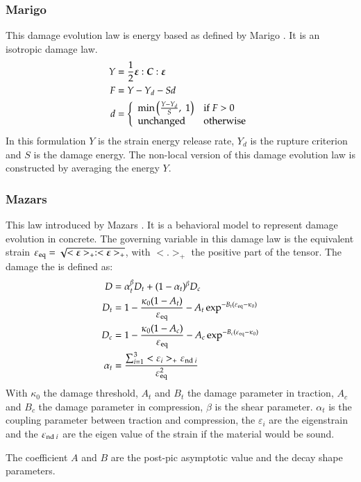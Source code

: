 \subsubsection{Marigo}
This damage evolution law is energy based as defined by Marigo \cite{marigo81a,
  lemaitre96a}. It is an isotropic damage law.
\begin{align}
  Y &= \frac{1}{2}\boldsymbol{\varepsilon}:\boldsymbol{C}:\boldsymbol{\varepsilon}\\
  F &= Y - Y_d - S d\\
  d &= \left\{
    \begin{array}{l l}
      \mathrm{min}\left(\frac{Y-Y_d}{S},\;1\right) & \mathrm{if}\; F > 0\\
      \mathrm{unchanged} & \mathrm{otherwise}
    \end{array}
  \right.
\end{align}
In this formulation $Y$ is the strain  energy release rate, $Y_d$ is the rupture
criterion and  $S$ is the damage  energy.  The non-local version  of this damage
evolution law is constructed by averaging the energy $Y$.

\subsubsection{Mazars}
This law introduced by Mazars \cite{mazars84a}. It is a behavioral model to
represent damage evolution in concrete. The governing variable in this damage
law is the equivalent strain $\varepsilon_{{\mathrm{eq}}} =
\sqrt{<\boldsymbol{\varepsilon}>_+:<\boldsymbol{\varepsilon}>_+}$, with $<.>_+$ the positive
part of the tensor.
The damage the is defined as:
\begin{align}
  D &= \alpha_t^\beta D_t + (1-\alpha_t)^\beta D_c\\
  D_t &= 1 - \frac{\kappa_0 (1- A_t)}{\varepsilon_{{\mathrm{eq}}}} - A_t \exp^{-B_t(\varepsilon_{{\mathrm{eq}}}-\kappa_0)}\\
  D_c &= 1 - \frac{\kappa_0 (1- A_c)}{\varepsilon_{{\mathrm{eq}}}} - A_c
  \exp^{-B_c(\varepsilon_{{\mathrm{eq}}}-\kappa_0)}\\
  \alpha_t &= \frac{\sum_{i=1}^3<\varepsilon_i>_+\varepsilon_{{\mathrm{nd}}\;i}}{\varepsilon_{{\mathrm{eq}}}^2}
\end{align}
With $\kappa_0$ the damage threshold, $A_t$ and $B_t$ the damage parameter in
traction, $A_c$ and $B_c$ the damage parameter in compression, $\beta$ is the
shear parameter. $\alpha_t$ is the coupling parameter between traction and
compression, the $\varepsilon_i$ are the eigenstrain and the
$\varepsilon_{{\mathrm{nd}}\;i}$ are the eigen value of the strain if the material
would be sound.

The coefficient $A$ and $B$ are the post-pic asymptotic
value and the decay shape parameters.


